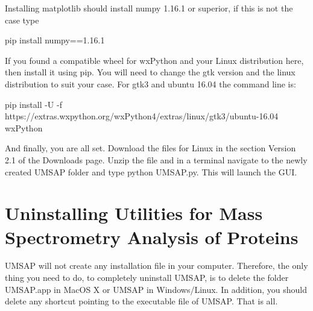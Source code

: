 Installing matplotlib should install numpy 1.16.1 or superior, if this is not the case type

pip install numpy==1.16.1

If you found a compatible wheel for wxPython and your Linux distribution here, then install it using pip. You will need to change the gtk version and the linux distribution to suit your case. For gtk3 and ubuntu 16.04 the command line is:

\newpage

pip install -U -f https://extras.wxpython.org/wxPython4/extras/linux/gtk3/ubuntu-16.04 wxPython

And finally, you are all set. Download the files for Linux in the section Version 2.1 of the Downloads page. Unzip the file and in a terminal navigate to the newly created UMSAP folder and type python UMSAP.py. This will launch the GUI.

\section{Uninstalling Utilities for Mass Spectrometry Analysis of Proteins}

UMSAP will not create any installation file in your computer. Therefore, the only thing you need to do, to completely uninstall UMSAP, is to delete the folder UMSAP.app in MacOS X or UMSAP in Windows/Linux. In addition, you should delete any shortcut pointing to the executable file of UMSAP. That is all.  